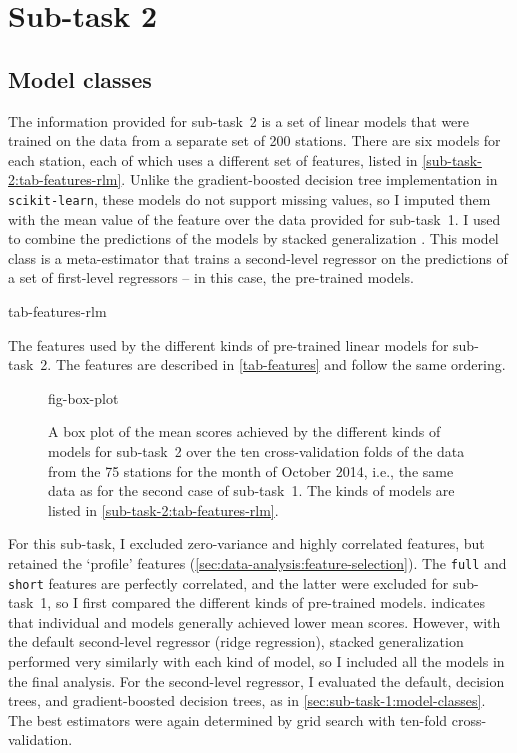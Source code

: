 
\section{Sub-task 2}
\label{sec:sub-task-2}

\subsection{Model classes}
\label{sec:sub-task-2:model-classes}

The information provided for sub-task~2 is a set of linear models that were trained on
the data from a separate set of 200 stations.
There are six models for each station, each of which uses a different set of features,
listed in \cref{sub-task-2:tab-features-rlm}.
Unlike the gradient-boosted decision tree implementation in \texttt{scikit-learn},
these models do not support missing values, so I imputed them with the mean value of
the feature over the data provided for sub-task~1.
I used  to combine the predictions of the models
by stacked generalization \parencite{Wolpert1992}.
This model class is a meta-estimator that trains a second-level regressor on the
predictions of a set of first-level regressors -- in this case, the pre-trained models.

\begin{table}
  \centering
  {tab-features-rlm}
  \caption{
    The features used by the different kinds of pre-trained linear models for sub-task~2.
    The features are described in \cref{tab-features} and follow the same ordering.
  }
  \label{sub-task-2:tab-features-rlm}
\end{table}

\begin{figure}
  \centering
  {fig-box-plot}
  \caption{
    A box plot of the mean scores achieved by the different kinds of models for
    sub-task~2 over the ten cross-validation folds of the data from the 75 stations for
    the month of October 2014, i.e., the same data as for the second case of sub-task~1.
    The kinds of models are listed in \cref{sub-task-2:tab-features-rlm}.
  }
  \label{sub-task-2:fig-box-plot}
\end{figure}

For this sub-task, I excluded zero-variance and highly correlated features, but
retained the `profile' features (\cref{sec:data-analysis:feature-selection}).
The \texttt{full} and \texttt{short} features are perfectly correlated, and the latter
were excluded for sub-task~1, so I first compared the different kinds of pre-trained
models.
 indicates that individual \rlmshort{} and \rlmshorttemp{} models
generally achieved lower mean scores.
However, with the default second-level regressor (ridge regression), stacked
generalization performed very similarly with each kind of model, so I included all the
models in the final analysis.
For the second-level regressor, I evaluated the default, decision trees, and
gradient-boosted decision trees, as in \cref{sec:sub-task-1:model-classes}.
The best estimators were again determined by grid search with ten-fold
cross-validation.

